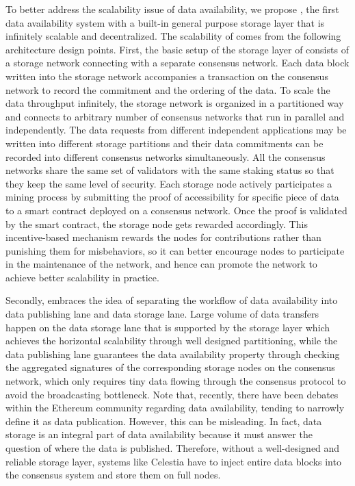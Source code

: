 To better address the scalability issue of data availability, we propose \project, the first data availability system with a built-in general purpose storage layer that is infinitely scalable and decentralized. The scalability of \projabbrev comes from the following architecture design points. 
First, the basic setup of the storage layer of \projabbrev consists of a storage network connecting with a separate consensus network. Each data block written into the storage network accompanies a transaction on the consensus network to record the commitment and the ordering of the data. 
To scale the data throughput infinitely, the storage network is organized in a partitioned way and connects to arbitrary number of consensus networks that run in parallel and independently. 
The data requests from different independent applications may be written into different storage partitions and their data commitments can be recorded into different consensus networks simultaneously.
All the consensus networks share the same set of validators with the same staking status so that they keep the same level of security.    
Each storage node actively participates a mining process by submitting the proof of accessibility for specific piece of data to a smart contract deployed on a consensus network. Once the proof is validated by the smart contract, the storage node gets rewarded accordingly. 
This incentive-based mechanism rewards the nodes for contributions rather than punishing them for misbehaviors, so it can better encourage nodes to participate in the maintenance of the network, and hence can promote the network to achieve better scalability in practice.

Secondly, \projabbrev embraces the idea of separating the workflow of data availability into data publishing lane and data storage lane. 
Large volume of data transfers happen on the data storage lane that is supported by the storage layer which achieves the horizontal scalability through well designed partitioning, while the data publishing lane guarantees the data availability property through checking the aggregated signatures of the corresponding storage nodes on the consensus network, which only requires tiny data flowing through the consensus protocol to avoid the broadcasting bottleneck. 
Note that, recently, there have been debates within the Ethereum community regarding data availability, tending to narrowly define it as data publication. However, this can be misleading. In fact, data storage is an integral part of data availability because it must answer the question of where the data is published. Therefore, without a well-designed and reliable storage layer, systems like Celestia have to inject entire data blocks into the consensus system and store them on full nodes.

